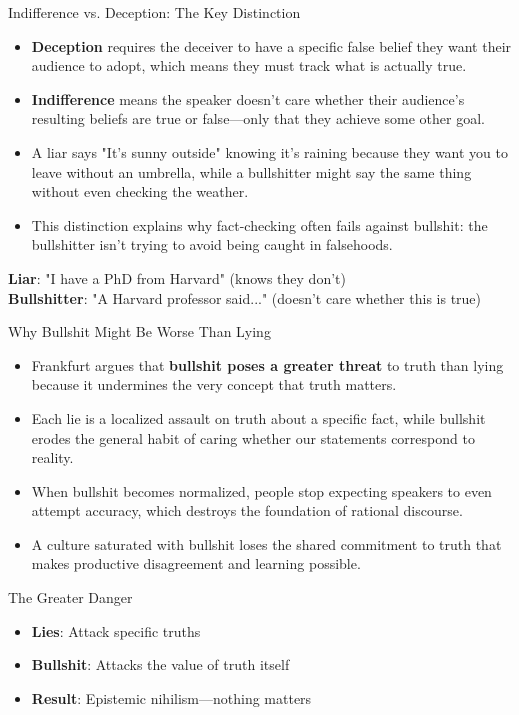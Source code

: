 \documentclass{beamer}
\begin{document}
	\begin{frame}{Indifference vs. Deception: The Key Distinction}
		\begin{itemize}
			\item \textbf{Deception} requires the deceiver to have a specific false belief they want their audience to adopt, which means they must track what is actually true.
			\item \textbf{Indifference} means the speaker doesn't care whether their audience's resulting beliefs are true or false—only that they achieve some other goal.
			\item A liar says "It's sunny outside" knowing it's raining because they want you to leave without an umbrella, while a bullshitter might say the same thing without even checking the weather.
			\item This distinction explains why fact-checking often fails against bullshit: the bullshitter isn't trying to avoid being caught in falsehoods.
		\end{itemize}
		
		\begin{example}
			\textbf{Liar}: "I have a PhD from Harvard" (knows they don't)\\
			\textbf{Bullshitter}: "A Harvard professor said..." (doesn't care whether this is true)
		\end{example}
	\end{frame}
	
	\begin{frame}{Why Bullshit Might Be Worse Than Lying}
		\begin{itemize}
			\item Frankfurt argues that \textbf{bullshit poses a greater threat} to truth than lying because it undermines the very concept that truth matters.
			\item Each lie is a localized assault on truth about a specific fact, while bullshit erodes the general habit of caring whether our statements correspond to reality.
			\item When bullshit becomes normalized, people stop expecting speakers to even attempt accuracy, which destroys the foundation of rational discourse.
			\item A culture saturated with bullshit loses the shared commitment to truth that makes productive disagreement and learning possible.
		\end{itemize}
		
		\begin{alertblock}{The Greater Danger}
			\begin{itemize}
				\item \textbf{Lies}: Attack specific truths
				\item \textbf{Bullshit}: Attacks the value of truth itself
				\item \textbf{Result}: Epistemic nihilism—nothing matters
			\end{itemize}
		\end{alertblock}
	\end{frame}
	
\end{document}
